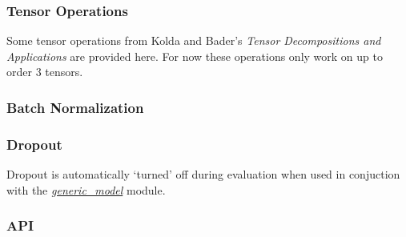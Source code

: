 \documentclass[letterpaper,10pt,english]{sphinxmanual}
\begin{document}
{\hyperref[node_ops:node_ops.x_dot_y]{\emph{}}}

{\hyperref[node_ops:node_ops.cosine]{\emph{}}}

{\hyperref[node_ops:node_ops.linear]{\emph{}}}

{\hyperref[node_ops:node_ops.embedding]{\emph{}}}

{\hyperref[node_ops:node_ops.lookup]{\emph{}}}

{\hyperref[node_ops:node_ops.khatri_rao]{\emph{}}}


\subsubsection{Tensor Operations}
\label{node_ops:tensor-operations}
Some tensor operations from Kolda and Bader's \emph{Tensor Decompositions and Applications} are provided here. For now these
operations only work on up to order 3 tensors.

{\hyperref[node_ops:node_ops.nmode_tensor_tomatrix]{\emph{}}}

{\hyperref[node_ops:node_ops.nmode_tensor_multiply]{\emph{}}}

{\hyperref[node_ops:node_ops.binary_tensor_combine]{\emph{}}}

{\hyperref[node_ops:node_ops.ternary_tensor_combine]{\emph{}}}


\subsubsection{Batch Normalization}
\label{node_ops:id4}
{\hyperref[node_ops:node_ops.batch_normalize]{\emph{}}}


\subsubsection{Dropout}
\label{node_ops:id5}
Dropout is automatically `turned' off during evaluation when used in conjuction with the {\hyperref[generic_model::doc]{\emph{\emph{generic\_model}}}} module.

{\hyperref[node_ops:node_ops.dropout]{\emph{}}}


\subsubsection{API}
\label{node_ops:api}\label{node_ops:module-node_ops}
\end{document}
